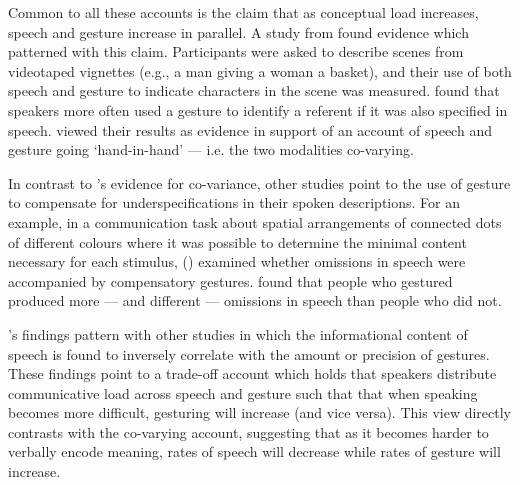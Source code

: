 \documentclass[a4paper,man,natbib]{apa6}
\begin{document}
Common to all these accounts is the claim that as conceptual load increases, speech and gesture increase in parallel.
A \citeyear{So2009} study from \citeauthor{So2009} found evidence which patterned with this claim. 
Participants were asked to describe scenes from videotaped vignettes (e.g., a man giving a woman a basket), and their use of both speech and gesture to indicate characters in the scene was measured.
\citeauthor{So2009} found that speakers more often used a gesture to identify a referent if it was also specified in speech. 
\citeauthor{So2009} viewed their results as evidence in support of an account of speech and gesture going `hand-in-hand' --- i.e. the two modalities co-varying.

In contrast to \citeauthor{So2009}'s evidence for co-variance, other studies point to the use of gesture to compensate for underspecifications in their spoken descriptions.
For an example, in a communication task about spatial arrangements of connected dots of different colours where it was possible to determine the minimal content necessary for each stimulus, \citeauthor{Melinger2004} (\citeyear{Melinger2004}) examined whether omissions in speech were accompanied by compensatory gestures. 
\citeauthor{Melinger2004} found that people who gestured produced more --- and different --- omissions in speech than people who did not. 

\citeauthor{Melinger2004}'s findings pattern with other studies \citep{Bangerter2004, DeRuiter2006, VanderSluis2007} in which the informational content of speech is found to inversely correlate with the amount or precision of gestures. 
These findings point to a trade-off account which holds that speakers distribute communicative load across speech and gesture such that that when speaking becomes more difficult, gesturing will increase (and vice versa). 
This view directly contrasts with the co-varying account, suggesting that as it becomes harder to verbally encode meaning, rates of speech will decrease while rates of gesture will increase. 
\end{document}
